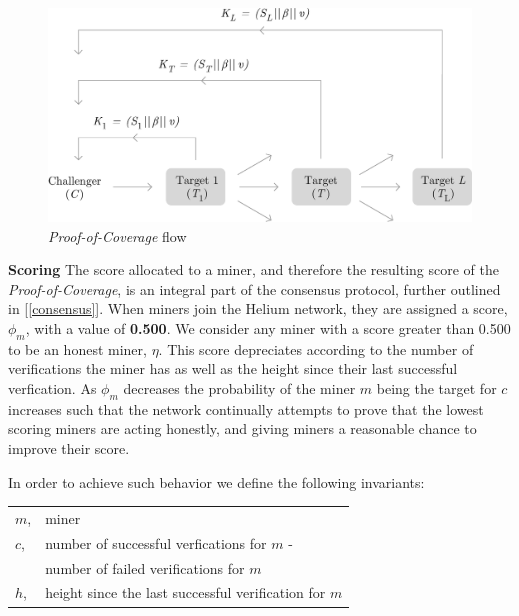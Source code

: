 \documentclass[UTF8, 10pt, nonatbib, nocopyrightspace, reprint]{sigplanconf}
\newcommand{\secref}[1]{[\autoref{#1}]}
\begin{document}
\begin{figure}[ht]
    \begin{center}
          \includegraphics[width=\columnwidth]{o_propagation.eps}
          \caption{\emph{Proof-of-Coverage} flow}
          \label{fig:poc-propogation}
     \end{center}
\end{figure}

\textbf{Scoring} \label{scores} The score allocated to a miner, and therefore the resulting score of the \emph{Proof-of-Coverage}, is an integral part of the consensus protocol, further outlined in \secref{consensus}. When miners join the Helium network, they are assigned a score, $\phi_m$, with a value of \textbf{0.500}. We consider any miner with a score greater than 0.500 to be an honest miner, $\eta$. This score depreciates according to the number of verifications the miner has as well as the height since their last successful verfication. As $\phi_m$ decreases the probability of the miner $m$ being the target for $c$ increases such that the network continually attempts to prove that the lowest scoring miners are acting honestly, and giving miners a reasonable chance to improve their score.

In order to achieve such behavior we define the following invariants:

\begin{tabular}{l l}
        $m$, & miner                                         \\
        $c$, &number of successful verfications for $m$ -\\
        & number of failed verifications for $m$ \\
        $h$,          & height since the last successful verification for $m$\\
\end{tabular}
\end{document}
